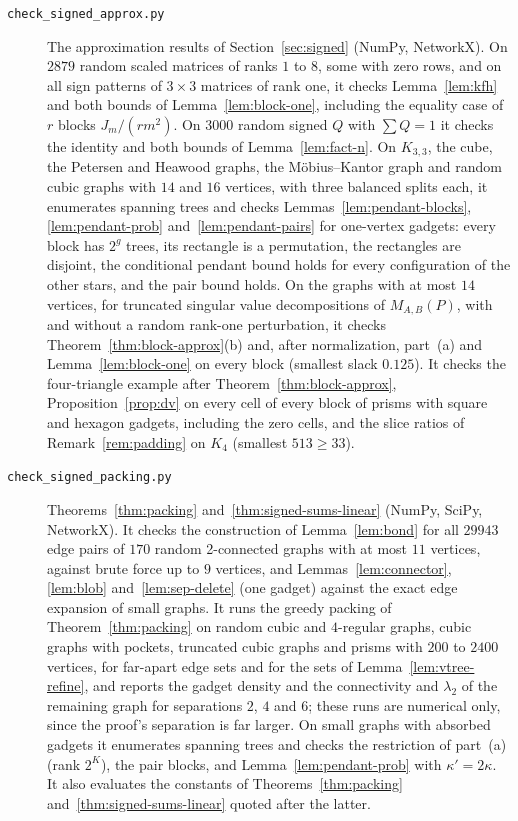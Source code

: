 \begin{description}
\item[\texttt{check\_signed\_approx.py}] The approximation results of Section~\ref{sec:signed} (NumPy, NetworkX). On $2879$ random scaled matrices of ranks $1$ to $8$, some with zero rows, and on all sign patterns of $3\times3$ matrices of rank one, it checks Lemma~\ref{lem:kfh} and both bounds of Lemma~\ref{lem:block-one}, including the equality case of $r$ blocks $J_m/(rm^2)$. On $3000$ random signed $Q$ with $\sum Q=1$ it checks the identity and both bounds of Lemma~\ref{lem:fact-n}. On $K_{3,3}$, the cube, the Petersen and Heawood graphs, the M\"obius--Kantor graph and random cubic graphs with $14$ and $16$ vertices, with three balanced splits each, it enumerates spanning trees and checks Lemmas~\ref{lem:pendant-blocks}, \ref{lem:pendant-prob} and~\ref{lem:pendant-pairs} for one-vertex gadgets: every block has $2^g$ trees, its rectangle is a permutation, the rectangles are disjoint, the conditional pendant bound holds for every configuration of the other stars, and the pair bound holds. On the graphs with at most $14$ vertices, for truncated singular value decompositions of $M_{A,B}(P)$, with and without a random rank-one perturbation, it checks Theorem~\ref{thm:block-approx}(b) and, after normalization, part~(a) and Lemma~\ref{lem:block-one} on every block (smallest slack $0.125$). It checks the four-triangle example after Theorem~\ref{thm:block-approx}, Proposition~\ref{prop:dv} on every cell of every block of prisms with square and hexagon gadgets, including the zero cells, and the slice ratios of Remark~\ref{rem:padding} on $K_4$ (smallest $513\ge33$).

\item[\texttt{check\_signed\_packing.py}] Theorems~\ref{thm:packing} and~\ref{thm:signed-sums-linear} (NumPy, SciPy, NetworkX). It checks the construction of Lemma~\ref{lem:bond} for all $29943$ edge pairs of $170$ random 2-connected graphs with at most $11$ vertices, against brute force up to $9$ vertices, and Lemmas~\ref{lem:connector}, \ref{lem:blob} and~\ref{lem:sep-delete} (one gadget) against the exact edge expansion of small graphs. It runs the greedy packing of Theorem~\ref{thm:packing} on random cubic and $4$-regular graphs, cubic graphs with pockets, truncated cubic graphs and prisms with $200$ to $2400$ vertices, for far-apart edge sets and for the sets of Lemma~\ref{lem:vtree-refine}, and reports the gadget density and the connectivity and $\lambda_2$ of the remaining graph for separations $2$, $4$ and $6$; these runs are numerical only, since the proof's separation is far larger. On small graphs with absorbed gadgets it enumerates spanning trees and checks the restriction of part~(a) (rank $2^K$), the pair blocks, and Lemma~\ref{lem:pendant-prob} with $\kappa'=2\kappa$. It also evaluates the constants of Theorems~\ref{thm:packing} and~\ref{thm:signed-sums-linear} quoted after the latter.
\end{description}

